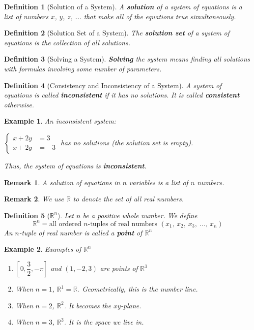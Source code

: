 \documentclass[12pt, a4paper]{article}
\newtheorem{df}{Definition}[subsection]
\newtheorem{eg}{Example}[subsection]
\newtheorem*{rmk}{\indent Remark}
\def\R{{\mathbb{R}}}
\begin{document}
\begin{df}[Solution of a System]
A \textbf{solution} of a system of equations is a list of numbers $x$, $y$, $z$, ... that make all of the equations true simultaneously.
\end{df}

\begin{df}[Solution Set of a System]
The \textbf{solution set} of a system of equations is the collection of all solutions.
\end{df}

\begin{df}[Solving a System]
\textbf{Solving} the system means finding all solutions with formulas involving some number of parameters.
\end{df}

\begin{df}[Consistency and Inconsistency of a System]
A system of equations is called \textbf{inconsistent} if it has no solutions. It is called \textbf{consistent} otherwise. 
\end{df}

\begin{eg}
An inconsistent system: \par

\begin{center} $\left\{\begin{aligned}x+2y&=3\\x+2y&=-3\end{aligned}\right.$ has no solutions (the solution set is \textit{empty}).
\end{center}
Thus, the system of equations is \textbf{inconsistent}.
\end{eg}

\begin{rmk}
A solution of equations in $n$ variables is a list of $n$ numbers.
\end{rmk}

\begin{rmk}
We use $\R$ to denote the set of all real numbers.
\end{rmk}

\begin{df}[$\R^n$]
Let $n$ be a positive whole number. We define
$$\R^n=\text{all ordered }n\text{-tuples of real numbers }(x_1,\ x_2,\ x_3,\ ...,\ x_n)$$
An $n$-tuple of real number is called a \textbf{point} of $\R^n$
\end{df}
\begin{eg}
Examples of $\R^n$
\begin{enumerate}
\item $\left[0, \dfrac{3}{2},-\pi\right]$ and $(1, -2, 3)$ are points of $\R^3$
\item When $n=1$, $\R^1=\R$. Geometrically, this is the number line.
\item When $n=2$, $\R^2$. It becomes the $xy$-plane. 
\item When $n=3$, $\R^3$. It is the \textit{space} we live in. 
\end{enumerate}
\end{eg}
\end{document}
